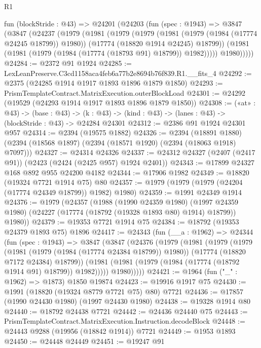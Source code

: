 \begin{lexlean}{R1}
\begin{coremodule}
  fun (blockStride : @43) =>
  @24201
    (@24203
      (fun (spec : @1943) =>
      @3847
        (@3847
          (@24237
            (@1979
              (@1981
                (@1979
                  (@1979
                    (@1981 (@1979 (@1984 (@17774 @24245 @18799)) @1980))
                    (@17774 (@18820 @1914 @24245) @18799))
                  (@1981 (@1981 (@1979 (@1984 (@17774 (@18793 @91) @18799)) @1982)))))
              @1980)))))
@24284 := @2372 @91 @1924
@24285 := LexLeanPreserve.C3cd1158aca4feb6a77b2e8694b76f839.R1.__fits_4
@24292 := @2375 (@24285 @1914 @1917 @1893 @1896 @1879 @1850)
@24293 := PrismTemplateContract.MatrixExecution.outerBlockLoad
@24301 := @24292 (@19529 (@24293 @1914 @1917 @1893 @1896 @1879 @1850))
@24308 := («at» : @43) ->
  (base : @43) -> (k : @43) -> (kind : @43) -> (lanes : @43) -> (blockStride : @43) -> @24284 @24301
@24312 := @2386 @91 @1924 @24301 @957
@24314 := @2394 (@19575 @1882)
@24326 := @2394
    (@18891 @1880)
    (@2394 (@18568 @1897) (@2394 (@18571 @1920) (@2394 (@18063 @1918) @7097)))
@24327 := @24314 @24326
@24337 := @24312 @24327 (@2407 (@2417 @91)) (@2423 (@2424 (@2425 @957) @1924 @2401))
@24343 := @17899 @24327 @168 @892 @955 @24200 @4182
@24344 := @17906 @1982
@24349 := @18820 (@19324 @7721 @1914 @75) @80
@24357 := @1979 (@1979 (@1979 (@24204 (@17774 @24349 @18799)) @1982) @1980)
@24359 := @1991 @24349 @1914
@24376 := @1979
    (@24357
      (@1988
        (@1990 @24359 @1980)
        (@1997 @24359 @1980)
        (@24227 (@17774 (@18792 (@19328 @1893 @80) @1914) @18799))
        @1980))
@24379 := @19353 @7721 @1914 @75
@24384 := @18792 (@19353 @24379 @1893 @75) @1896
@24417 := @24343
    (fun (__a : @1962) =>
    @24344
      (fun (spec : @1943) =>
      @3847
        (@3847
          (@24376
            (@1979
              (@1981
                (@1979
                  (@1979
                    (@1981 (@1979 (@1984 (@17774 @24384 @18799)) @1980))
                    (@17774 (@18820 @7172 @24384) @18799))
                  (@1981 (@1981 (@1979 (@1984 (@17774 (@18792 @1914 @91) @18799)) @1982)))))
              @1980)))))
@24421 := @1964 (fun ("_" : @1962) => @1873) @1850 @19874
@24423 := @19916 @1917 @75
@24430 := @1991 (@18820 (@19324 @8779 @7721 @75) @80) @7721
@24436 := @17857 (@1990 @24430 @1980) (@1997 @24430 @1980)
@24438 := @19328 @1914 @80
@24440 := @18792 @24438 @7721
@24442 := @24436 @24440 @75
@24443 := PrismTemplateContract.MatrixExecution.Instruction.decodeBlock
@24448 := @24443 @9288 (@19956 (@18842 @1914)) @7721
@24449 := @1953 @1893
@24450 := @24448 @24449
@24451 := @19247 @91

\end{coremodule}
\end{lexlean}
